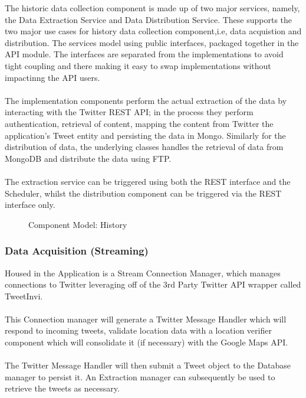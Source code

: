 \documentclass[12pt]{article} %
\begin{document}
	The historic data collection component is made up of two major services, namely, the Data Extraction Service and Data Distribution Service. These supports the two major use cases for history data collection component,i.e, data acquistion and distribution. The services model using public interfaces, packaged together in the API module. The interfaces are separated from the implementations to avoid tight coupling and there making it easy to swap implementations without impactinng the API users.\\
	\\
	The implementation components perform the actual extraction of the data by interacting with the Twitter REST API; in the process they perform authentication, retrieval of content, mapping the content from Twitter the application's Tweet entity and persisting  the data in Mongo. Similarly  for the distribution of data, the underlying classes handles the retrieval of data from MongoDB and distribute the data using FTP.\\
	\\
	The extraction service can be triggered using both the REST interface and the Scheduler, whilst the distribution component can be triggered via the REST interface only.
	
	
		\begin{figure}[H] %
			\caption{Component Model: History}
			\label{fig:speciation}
		\end{figure}
	
	\subsubsection{Data Acquisition (Streaming)}
	
	Housed in the Application is a Stream Connection Manager, which manages connections to Twitter leveraging off of the 3rd Party Twitter API wrapper called TweetInvi.\\
	\
	\\
	This Connection manager will generate a Twitter Message Handler which will respond to incoming tweets, validate location data with a location verifier component which will consolidate it (if necessary) with the Google Maps API. \\
	\
	\\
	The Twitter Message Handler will then submit a Tweet object to the Database manager to persist it. An Extraction manager can subsequently be used to retrieve the tweets as necessary.
	
\end{document}
